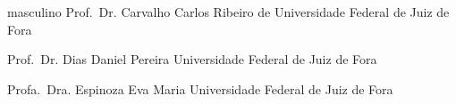 \coorientador%
{masculino}
{Prof.\ Dr.}
{Carvalho}
{Carlos Ribeiro de}
{Universidade Federal de Juiz de Fora}

\examinadorUm%
{Prof.\ Dr.}
{Dias}
{Daniel Pereira}
{Universidade Federal de Juiz de Fora}

\examinadorDois%
{Profa.\ Dra.}
{Espinoza}
{Eva Maria}
{Universidade Federal de Juiz de Fora}




